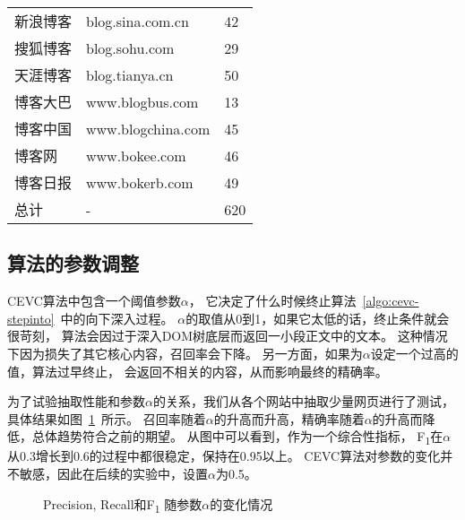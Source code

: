 \begin{table}[htbp]
\begin{minipage}{0.45\textwidth}
\begin{tabular}{lll}
新浪博客 & blog.sina.com.cn & 42 \\
搜狐博客 & blog.sohu.com & 29 \\
天涯博客 & blog.tianya.cn & 50 \\
博客大巴 & www.blogbus.com & 13 \\
博客中国 & www.blogchina.com & 45 \\
博客网 & www.bokee.com & 46 \\
博客日报 & www.bokerb.com & 49 \\
总计 & - & 620 \\
\bottomrule[1.5pt]
\end{tabular}
\end{minipage}
\end{table}

\subsection{算法的参数调整}
CEVC算法中包含一个阈值参数$\alpha$，
它决定了什么时候终止算法~\ref{algo:cevc-stepinto}~中的向下深入过程。
$\alpha$的取值从0到1，如果它太低的话，终止条件就会很苛刻，
算法会因过于深入DOM树底层而返回一小段正文中的文本。
这种情况下因为损失了其它核心内容，召回率会下降。
另一方面，如果为$\alpha$设定一个过高的值，算法过早终止，
会返回不相关的内容，从而影响最终的精确率。

为了试验抽取性能和参数$\alpha$的关系，我们从各个网站中抽取少量网页进行了测试，
具体结果如图~\ref{fig:cevc-threshold}~所示。
召回率随着$\alpha$的升高而升高，精确率随着$\alpha$的升高而降低，总体趋势符合之前的期望。
从图中可以看到，作为一个综合性指标，
F\textsubscript{1}在$\alpha$从0.3增长到0.6的过程中都很稳定，保持在0.95以上。
CEVC算法对参数的变化并不敏感，因此在后续的实验中，设置$\alpha$为0.5。

\begin{figure}[htbp]
\centering
{}
\caption{Precision, Recall和F\textsubscript{1}
随参数$\alpha$的变化情况}
\label{fig:cevc-threshold}
\end{figure}

